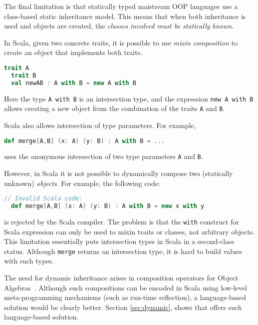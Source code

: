 The final limitation is that statically typed maistream OOP languages use a
class-based static inheritance model. This means that when both inheritance 
is used and objects are created, the \emph{classes involved must be statically known}.
\begin{comment}
Intersection types date back as early as Coppo et al.'s
work~\cite{coppo1981functional}. Since then researchers have studied
intersection types, and some languages have adopted them in one form or another.

In Java, for example,
\begin{lstlisting}[language=java]
  interface AwithB extends A, B {}
\end{lstlisting}
introduces a new interface \lstinline$AwithB$ that satisfies the interface of
both \lstinline{A} and \lstinline{B}. 
\end{comment}
In Scala, given two concrete traits, it is
possible to use \textit{mixin composition} to create an object that implements
both traits.
\begin{lstlisting}[language=scala]
  trait A
  trait B
  val newAB : A with B = new A with B
\end{lstlisting}
\noindent Here the type \lstinline{A with B} is an intersection type,
and the expression \lstinline{new A with B} allows creating a new 
object from the combination of the traits \lstinline{A} and
\lstinline{B}.

Scala also allows intersection of type parameters. For example,
\begin{lstlisting}[language=scala]
  def merge[A,B] (x: A) (y: B) : A with B = ...
\end{lstlisting}
uses the anonymous intersection of two type parameters \lstinline{A} and
\lstinline{B}.

However, in Scala it is not possible to dynamically compose two
(statically unknown) \emph{objects}. For
example, the following code:
\begin{lstlisting}[language=scala]
  // Invalid Scala code:
  def merge[A,B] (x: A) (y: B) : A with B = new x with y
\end{lstlisting}
is rejected by the Scala compiler. The problem is that the \lstinline$with$
construct for Scala expression can only be used to mixin traits or classes, not
arbitrary objects. This limitation essentially puts intersection types in Scala
in a second-class status. Although \lstinline{merge} returns an intersection
type, it is hard to build values with such types. 

The need for dynamic inheritance arises in composition operators for
Object Algebras~\cite{}. Although such compositions can be encoded in
Scala using low-level meta-programming mechanisms (such as run-time
reflection), a language-based solution would be clearly better. 
Section \ref{sec:dynamic}, shows that \name offers such language-based 
solution.

